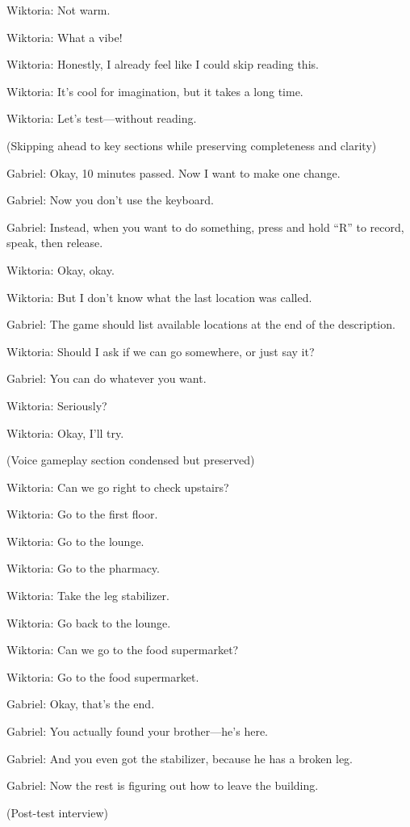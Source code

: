 Wiktoria: Not warm.

Wiktoria: What a vibe!

Wiktoria: Honestly, I already feel like I could skip reading this.

Wiktoria: It’s cool for imagination, but it takes a long time.

Wiktoria: Let’s test—without reading.

(Skipping ahead to key sections while preserving completeness and clarity)

Gabriel: Okay, 10 minutes passed. Now I want to make one change.

Gabriel: Now you don’t use the keyboard.

Gabriel: Instead, when you want to do something, press and hold “R” to record, speak, then release.

Wiktoria: Okay, okay.

Wiktoria: But I don’t know what the last location was called.

Gabriel: The game should list available locations at the end of the description.

Wiktoria: Should I ask if we can go somewhere, or just say it?

Gabriel: You can do whatever you want.

Wiktoria: Seriously?

Wiktoria: Okay, I’ll try.

(Voice gameplay section condensed but preserved)

Wiktoria: Can we go right to check upstairs?

Wiktoria: Go to the first floor.

Wiktoria: Go to the lounge.

Wiktoria: Go to the pharmacy.

Wiktoria: Take the leg stabilizer.

Wiktoria: Go back to the lounge.

Wiktoria: Can we go to the food supermarket?

Wiktoria: Go to the food supermarket.

Gabriel: Okay, that’s the end.

Gabriel: You actually found your brother—he’s here.

Gabriel: And you even got the stabilizer, because he has a broken leg.

Gabriel: Now the rest is figuring out how to leave the building.

(Post-test interview)

